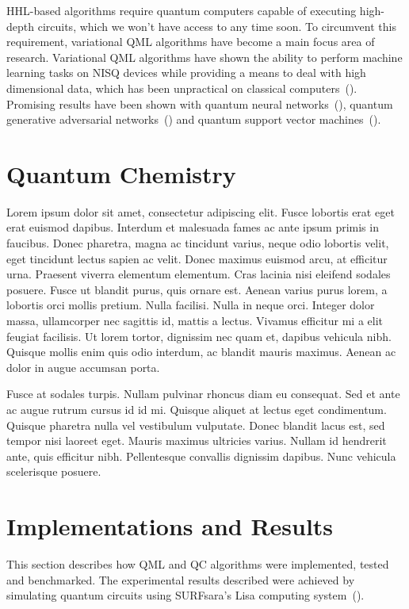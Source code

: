 \documentclass[a4paper,10pt]{article}
\begin{document}
HHL-based algorithms require quantum computers capable of executing high-depth circuits, which we won't have access to any time soon.
To circumvent this requirement, variational QML algorithms have become a main focus area of research.
Variational QML algorithms have shown the ability to perform machine learning tasks on NISQ devices while providing a means to deal with high dimensional data, which has been unpractical on classical computers~(\cite{mitarai2018quantum}).
Promising results have been shown with quantum neural networks~(\cite{qnn-near-term, schuld2018circuit, fanizza2019optimal}), quantum generative adversarial networks~(\cite{romero2019variational, benedetti2019adversarial}) and quantum support vector machines~(\cite{havlivcek2019supervised, schuld2019quantum}).

\section{Quantum Chemistry} \label{sec:quantum-chemistry}
Lorem ipsum dolor sit amet, consectetur adipiscing elit. Fusce lobortis erat eget erat euismod dapibus. Interdum et malesuada fames ac ante ipsum primis in faucibus. Donec pharetra, magna ac tincidunt varius, neque odio lobortis velit, eget tincidunt lectus sapien ac velit. Donec maximus euismod arcu, at efficitur urna. Praesent viverra elementum elementum. Cras lacinia nisi eleifend sodales posuere. Fusce ut blandit purus, quis ornare est. Aenean varius purus lorem, a lobortis orci mollis pretium. Nulla facilisi. Nulla in neque orci. Integer dolor massa, ullamcorper nec sagittis id, mattis a lectus. Vivamus efficitur mi a elit feugiat facilisis. Ut lorem tortor, dignissim nec quam et, dapibus vehicula nibh. Quisque mollis enim quis odio interdum, ac blandit mauris maximus. Aenean ac dolor in augue accumsan porta.

Fusce at sodales turpis. Nullam pulvinar rhoncus diam eu consequat. Sed et ante ac augue rutrum cursus id id mi. Quisque aliquet at lectus eget condimentum. Quisque pharetra nulla vel vestibulum vulputate. Donec blandit lacus est, sed tempor nisi laoreet eget. Mauris maximus ultricies varius. Nullam id hendrerit ante, quis efficitur nibh. Pellentesque convallis dignissim dapibus. Nunc vehicula scelerisque posuere.

\section{Implementations and Results} \label{sec:implementation-and-results}
This section describes how QML and QC algorithms were implemented, tested and benchmarked.
The experimental results described were achieved by simulating quantum circuits using SURFsara's Lisa computing system~(\cite{surfsara-lisa}).
\end{document}
